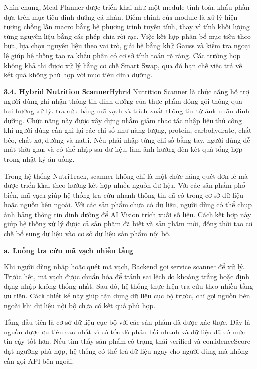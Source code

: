 Nhìn chung, Meal Planner được triển khai như một module tính toán khẩu phần dựa trên mục tiêu dinh dưỡng cá nhân. Điểm chính của module là xử lý hiện tượng chồng lấn macro bằng hệ phương trình tuyến tính, thay vì tính khối lượng từng nguyên liệu bằng các phép chia rời rạc. Việc kết hợp phân bổ mục tiêu theo bữa, lựa chọn nguyên liệu theo vai trò, giải hệ bằng khử Gauss và kiểm tra ngoại lệ giúp hệ thống tạo ra khẩu phần có cơ sở tính toán rõ ràng. Các trường hợp không khả thi được xử lý bằng cơ chế Smart Swap, qua đó hạn chế việc trả về kết quả không phù hợp với mục tiêu dinh dưỡng.

\textbf{3.4. Hybrid Nutrition Scanner}Hybrid Nutrition Scanner là chức năng hỗ trợ người dùng ghi nhận thông tin dinh dưỡng của thực phẩm đóng gói thông qua hai hướng xử lý: tra cứu bằng mã vạch và trích xuất thông tin từ ảnh nhãn dinh dưỡng. Chức năng này được xây dựng nhằm giảm thao tác nhập liệu thủ công khi người dùng cần ghi lại các chỉ số như năng lượng, protein, carbohydrate, chất béo, chất xơ, đường và natri. Nếu phải nhập từng chỉ số bằng tay, người dùng dễ mất thời gian và có thể nhập sai dữ liệu, làm ảnh hưởng đến kết quả tổng hợp trong nhật ký ăn uống.

Trong hệ thống NutriTrack, scanner không chỉ là một chức năng quét đơn lẻ mà được triển khai theo hướng kết hợp nhiều nguồn dữ liệu. Với các sản phẩm phổ biến, mã vạch giúp hệ thống tra cứu nhanh thông tin đã có trong cơ sở dữ liệu hoặc nguồn bên ngoài. Với các sản phẩm chưa có dữ liệu, người dùng có thể chụp ảnh bảng thông tin dinh dưỡng để AI Vision trích xuất số liệu. Cách kết hợp này giúp hệ thống xử lý được cả sản phẩm đã biết và sản phẩm mới, đồng thời tạo cơ chế bổ sung dữ liệu vào cơ sở dữ liệu sản phẩm nội bộ.

\textbf{a. Luồng tra cứu mã vạch nhiều tầng}

Khi người dùng nhập hoặc quét mã vạch, Backend gọi service scanner để xử lý. Trước hết, mã vạch được chuẩn hóa để tránh sai lệch do khoảng trắng hoặc định dạng nhập không thống nhất. Sau đó, hệ thống thực hiện tra cứu theo nhiều tầng ưu tiên. Cách thiết kế này giúp tận dụng dữ liệu cục bộ trước, chỉ gọi nguồn bên ngoài khi dữ liệu nội bộ chưa có kết quả phù hợp.

Tầng đầu tiên là cơ sở dữ liệu cục bộ với các sản phẩm đã được xác thực. Đây là nguồn được ưu tiên cao nhất vì có tốc độ phản hồi nhanh và dữ liệu đã có mức tin cậy tốt hơn. Nếu tìm thấy sản phẩm có trạng thái verified và confidenceScore đạt ngưỡng phù hợp, hệ thống có thể trả dữ liệu ngay cho người dùng mà không cần gọi API bên ngoài.

